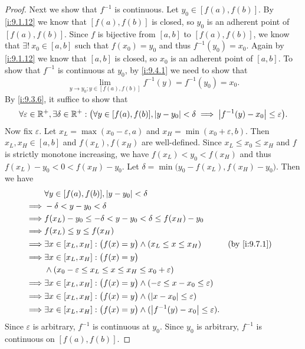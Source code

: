 \begin{proof}
  Next we show that \(f^{-1}\) is continuous.
  Let \(y_0 \in [f(a), f(b)]\).
  By \cref{i:9.1.12} we know that \([f(a), f(b)]\) is closed, so \(y_0\) is an adherent point of \([f(a), f(b)]\).
  Since \(f\) is bijective from \([a, b]\) to \([f(a), f(b)]\), we know that \(\exists!\ x_0 \in [a, b]\) such that \(f(x_0) = y_0\) and thus \(f^{-1}(y_0) = x_0\).
  Again by \cref{i:9.1.12} we know that \([a, b]\) is closed, so \(x_0\) is an adherent point of \([a, b]\).
  To show that \(f^{-1}\) is continuous at \(y_0\), by \cref{i:9.4.1} we need to show that
  \[
    \lim_{y \to y_0 ; y \in [f(a), f(b)]} f^{-1}(y) = f^{-1}(y_0) = x_0.
  \]
  By \cref{i:9.3.6}, it suffice to show that
  \[
    \forall \varepsilon \in \mathbb{R}^+, \exists \delta \in \mathbb{R}^+ : \big(\forall y \in [f(a), f(b)], \left\lvert y - y_0\right\rvert < \delta \implies \left\lvert f^{-1}(y) - x_0\right\rvert \leq \varepsilon\big).
  \]
  Now fix \(\varepsilon\).
  Let \(x_L = \max(x_0 - \varepsilon, a)\) and \(x_H = \min(x_0 + \varepsilon, b)\).
  Then \(x_L, x_H \in [a, b]\) and \(f(x_L), f(x_H)\) are well-defined.
  Since \(x_L \leq x_0 \leq x_H\) and \(f\) is strictly monotone increasing, we have \(f(x_L) < y_0 < f(x_H)\) and thus \(f(x_L) - y_0 < 0 < f(x_H) - y_0\).
  Let \(\delta = \min\big(y_0 - f(x_L), f(x_H) - y_0\big)\).
  Then we have
  \begin{align*}
             & \forall y \in [f(a), f(b)], \abs{y - y_0} < \delta                                                                 \\
    \implies & -\delta < y - y_0 < \delta                                                                                         \\
    \implies & f(x_L) - y_0 \leq -\delta < y - y_0 < \delta \leq f(x_H) - y_0                                                     \\
    \implies & f(x_L) \leq y \leq f(x_H)                                                                                          \\
    \implies & \exists x \in [x_L, x_H] : \big(f(x) = y\big) \land (x_L \leq x \leq x_H)                        &  & \by{i:9.7.1} \\
    \implies & \exists x \in [x_L, x_H] : \big(f(x) = y\big)                                                                      \\
             & \land (x_0 - \varepsilon \leq x_L \leq x \leq x_H \leq x_0 + \varepsilon)                                          \\
    \implies & \exists x \in [x_L, x_H] : \big(f(x) = y\big) \land (-\varepsilon \leq x - x_0 \leq \varepsilon)                   \\
    \implies & \exists x \in [x_L, x_H] : \big(f(x) = y\big) \land (\abs{x - x_0} \leq \varepsilon)                               \\
    \implies & \exists x \in [x_L, x_H] : \big(f(x) = y\big) \land (\abs{f^{-1}(y) - x_0} \leq \varepsilon).
  \end{align*}
  Since \(\varepsilon\) is arbitrary, \(f^{-1}\) is continuous at \(y_0\).
  Since \(y_0\) is arbitrary, \(f^{-1}\) is continuous on \([f(a), f(b)]\).


\end{proof}
